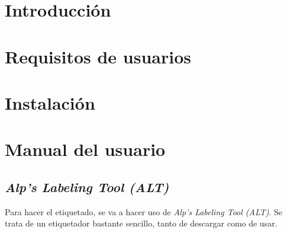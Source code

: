 
\section{Introducción}

\section{Requisitos de usuarios}

\section{Instalación}

\section{Manual del usuario}
\subsection{\textit{Alp’s Labeling Tool (ALT)}}

Para hacer el etiquetado, se va a hacer uso de \textit{Alp’s Labeling Tool (ALT)}.
Se trata de un etiquetador bastante sencillo, tanto de descargar como de usar.
